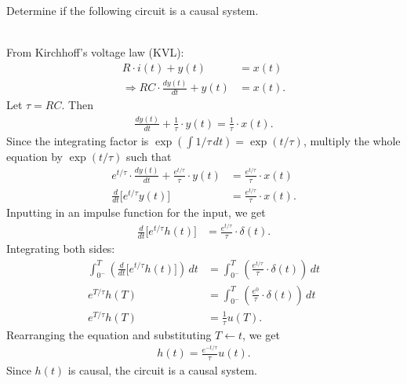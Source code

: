 \documentclass{report}
\begin{document}
\begin{example}
    Determine if the following circuit is a causal system. \\ \\
\end{example}
\begin{solution}
    From Kirchhoff's voltage law (KVL):
    \begin{align*}
        R\cdot i(t) + y(t) &= x(t) \\
        \Longrightarrow RC \cdot \frac{dy(t)}{dt} + y(t) &= x(t).
    \end{align*}
    Let $\tau=RC$. Then
    \begin{align*}
        \frac{dy(t)}{dt} + \frac{1}{\tau} \cdot y(t) = \frac{1}{\tau} \cdot x(t).
    \end{align*}
    Since the integrating factor is $\exp\left(\int 1/\tau \,dt\right) = \exp(t/\tau)$, multiply the whole equation by $\exp(t/\tau)$ such that 
    \begin{align*}
        e^{t/\tau} \cdot \frac{dy(t)}{dt} + \frac{e^{t/\tau}}{\tau} \cdot y(t) &= \frac{e^{t/\tau}}{\tau} \cdot x(t) \\
        \frac{d}{dt} \big[e^{t/\tau} y(t)\big] &= \frac{e^{t/\tau}}{\tau} \cdot x(t).
    \end{align*}
    Inputting in an impulse function for the input, we get
    \begin{align*}
        \frac{d}{dt} \big[e^{t/\tau} h(t)\big] &= \frac{e^{t/\tau}}{\tau} \cdot \delta(t).
    \end{align*}
    Integrating both sides:
    \begin{align*}
        \int_{0^-}^{T} \left(\frac{d}{dt} \big[e^{t/\tau} h(t)\big]\right) \,dt &= \int_{0^-}^{T} \left(\frac{e^{t/\tau}}{\tau} \cdot \delta(t)\right) \,dt \\
        e^{T/\tau} h(T) &= \int_{0^-}^{T} \left(\frac{e^{0}}{\tau} \cdot \delta(t)\right) \,dt \\
        e^{T/\tau} h(T) &= \frac{1}{\tau} u(T).
    \end{align*}
    Rearranging the equation and substituting $T\leftarrow t$, we get
    \begin{align*}
        h(t) = \frac{e^{-t/\tau}}{\tau} u(t).
    \end{align*}
    Since $h(t)$ is causal, the circuit is a causal system.
\end{solution}
\end{document}
